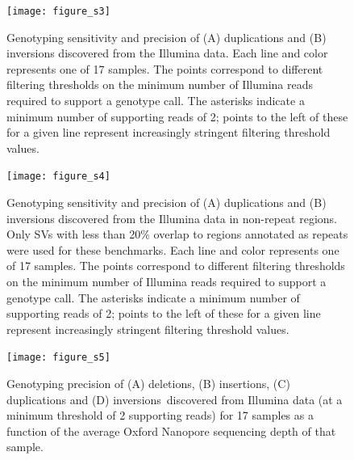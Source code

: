 \documentclass[12pt]{article}
\newenvironment{cfigure}
	{\begin{figure} \centering}
	{\end{figure}}
\begin{document}
\clearpage%

\begin{cfigure}
	\texttt{[image: figure\_s3]}
	
	\caption[Sensitivity and precision of Illumina duplication and inversion genotyping]{
		Genotyping sensitivity and precision of (A) duplications and (B) inversions discovered from the Illumina data.
		Each line and color represents one of 17 samples. 
		The points correspond to different filtering thresholds on the minimum number of Illumina reads required to support a genotype call.
		The asterisks indicate a minimum number of supporting reads of 2; points to the left of these for a given line represent increasingly stringent filtering threshold values.
	}

	\label{fig_s3}

\end{cfigure}

\clearpage%

\begin{cfigure}
	\texttt{[image: figure\_s4]}

	\caption[Sensitivity and precision of Illumina duplication and inversion genotyping in non-repeat regions]{
		Genotyping sensitivity and precision of (A) duplications and (B) inversions discovered from the Illumina data in non-repeat regions.
		Only SVs with less than 20\% overlap to regions annotated as repeats were used for these benchmarks. 
		Each line and color represents one of 17 samples. 
		The points correspond to different filtering thresholds on the minimum number of Illumina reads required to support a genotype call.
		The asterisks indicate a minimum number of supporting reads of 2; points to the left of these for a given line represent increasingly stringent filtering threshold values.
	}

	\label{fig_s4}

\end{cfigure}

\clearpage%

\begin{cfigure}
	\texttt{[image: figure\_s5]}

	\caption[Relationship between Oxford Nanopore sequencing depth and genotyping precision of Illumina SVs]{
		Genotyping precision of (A) deletions, (B) insertions, (C) duplications and (D) inversions~discovered from Illumina data (at a minimum threshold of 2 supporting reads) for 17 samples as a function of the average Oxford Nanopore sequencing depth of that sample.
	}

	\label{fig_s5}

\end{cfigure}
\end{document}
